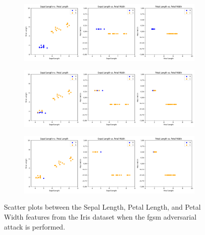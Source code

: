 \begin{figure}[!h]
  \centering

  \begin{subfigure}{\textwidth}
      \includegraphics[width=\linewidth]{figures/adversarial_analysis/adversarial-fgsm-0.1.png}
      \label{fig:adv1}
  \end{subfigure}

  \begin{subfigure}{\textwidth}
    \includegraphics[width=\linewidth]{figures/adversarial_analysis/adversarial-fgsm-0.3.png}
    \label{fig:adv2}
  \end{subfigure}

  \begin{subfigure}{\textwidth}
    \includegraphics[width=\linewidth]{figures/adversarial_analysis/adversarial-fgsm-0.5.png}
    \label{fig:adv3}
  \end{subfigure}

  \caption{Scatter plots between the Sepal Length, Petal Length, and Petal Width features from the Iris dataset when the \ac{fgsm} adversarial attack is performed.}
  \label{fig:adv-fgsm}
\end{figure} \

